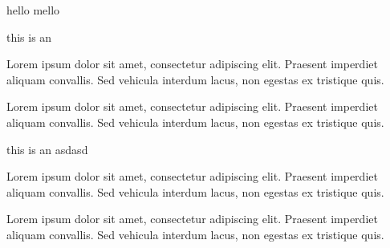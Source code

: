 \documentclass[a4paper]{scrartcl}
\begin{document}
hello mello



this is an 


Lorem ipsum dolor sit amet, consectetur adipiscing elit. Praesent imperdiet aliquam convallis. Sed vehicula interdum lacus, non egestas ex tristique quis.


Lorem ipsum dolor sit amet, consectetur adipiscing elit. Praesent imperdiet aliquam convallis. Sed vehicula interdum lacus, non egestas ex tristique quis.


this is an  asdasd


Lorem ipsum dolor sit amet, consectetur adipiscing elit. Praesent imperdiet aliquam convallis. Sed vehicula interdum lacus, non egestas ex tristique quis.




Lorem ipsum dolor sit amet, consectetur adipiscing elit. Praesent imperdiet aliquam convallis. Sed vehicula interdum lacus, non egestas ex tristique quis.

\hrflower
\hrflowerl
\hrflowerr
\end{document}
